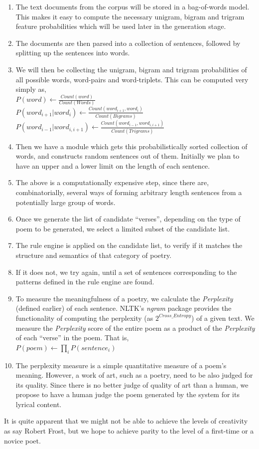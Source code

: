 \documentclass[10pt, letter,twocolumn]{IEEEtran}
\begin{document}
\begin{enumerate}
\item The text documents from the corpus will be stored in a bag-of-words model. This makes it easy to compute the necessary unigram, bigram and trigram feature probabilities which will be used later in the generation stage.
\item The documents are then parsed into a collection of sentences, followed by splitting up the sentences into words.
\item We will then be collecting the unigram, bigram and trigram probabilities of all possible words, word-pairs and word-triplets. This can be computed very simply as, \\
$P(word) \gets \frac{Count(word)}{Count(Words)}$ \\[0.3cm]
$P(word_{i+1} | word_i) \gets \frac{Count(word_{i+1}, word_i)}{Count(Bigrams)} $ \\ [0.3cm]
$P(word_{i-1} | word_{i,i+1}) \gets \frac{Count(word_{i-1}, word_{i,i+1})}{Count(Trigrams)}$ \\ [0.3cm] 
\item Then we have a module which gets this probabilistically sorted collection of words, and constructs random sentences out of them. Initially we plan to have an upper and a lower limit on the length of each sentence.
\item The above is a computationally expensive step, since there are, combinatorially, several ways of forming arbitrary length sentences from a potentially large group of words.
\item Once we generate the list of candidate ``verses'', depending on the type of poem to be generated, we select a limited subset of the candidate list.
\item The rule engine is applied on the candidate list, to verify if it matches the structure and semantics of that category of poetry.
\item If it does not, we try again, until a set of sentences corresponding to the patterns defined in the rule engine are found.
\item To measure the meaningfulness of a poetry, we calculate the \textit{Perplexity} (defined earlier) of each sentence. NLTK's \emph{ngram} package provides the functionality of computing the perplexity (as $2^{Cross\_Entropy}$) of a given text. We measure the \textit{Perplexity} score of the entire poem as a product of the \textit{Perplexity} of each ``verse'' in the poem. That is, \\
	$P(poem) \gets \prod_i P(sentence_i)$
\item The perplexity measure is a simple quantitative measure of a poem's meaning. However, a work of art, such as a poetry, need to be also judged for its quality. Since there is no better judge of quality of art than a human, we propose to have a human judge the poem generated by the system for its lyrical content.
\end{enumerate}
It is quite apparent that we might not be able to achieve the levels of creativity as say Robert Frost, but we hope to achieve parity to the level of a first-time or a novice poet.
\end{document}
